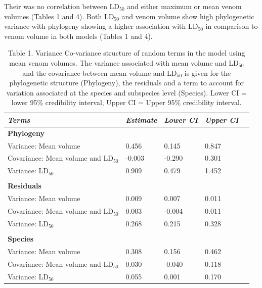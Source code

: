 Their was no correlation between LD$_{50}$ and either maximum or mean venom volumes (Tables 1 and 4). Both LD$_{50}$  and venom volume show high phylogenetic variance with phylogeny showing a higher association with LD$_{50}$ in comparison to venom volume in both models (Tables 1 and 4). 

\clearpage

\begin{table}[H]
  \centering
    \caption[ ]{Table 1. Variance Co-variance structure of random terms in the model using mean venom volumes. The variance associated with mean volume and LD$_{50}$ and the covariance between mean volume and LD$_{50}$ is given for the phylogenetic structure (Phylogeny), the residuals and a term to account for variation associated at the species and subspecies level (Species). Lower CI = lower 95\% credibility interval, Upper CI = Upper 95\% credibility interval.}
\begin{tabular}{*5l}    \toprule
\emph{Terms} & \emph{Estimate} & \emph{Lower CI} & \emph{Upper CI}\\\midrule
\textbf{Phylogeny} &   &   &  \\ 
Variance: Mean volume & 0.456 & 0.145 & 0.847 \\
Covariance: Mean volume and LD$_{50}$ &-0.003  &-0.290  & 0.301 \\
Variance: LD$_{50}$ & 0.909 & 0.479 & 1.452 \\

 &   &   &  \\

\textbf{Residuals} &   &   &  \\ 
Variance: Mean volume & 0.009 & 0.007 & 0.011 \\
Covariance: Mean volume and LD$_{50}$ & 0.003  &  -0.004  & 0.011 \\
Variance: LD$_{50}$ & 0.268 & 0.215 & 0.328 \\

 &   &   &  \\ 

\textbf{Species} &   &   &  \\ 
Variance: Mean volume & 0.308 & 0.156 & 0.462 \\
Covariance: Mean volume and LD$_{50}$ & 0.030  &  -0.040  & 0.118 \\
Variance: LD$_{50}$ & 0.055 & 0.001 & 0.170 \\\bottomrule
 \hline
\end{tabular}
  \label{tbl:Table 1.}
\end{table}




